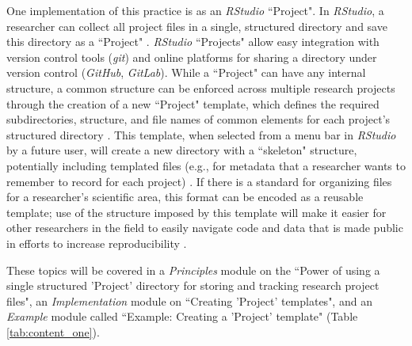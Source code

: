 \documentclass[pdftex,english,11.5pt,parskip=half]{scrartcl}
\begin{document}
One implementation of this practice is as an \textit{RStudio} ``Project". In \textit{RStudio}, a researcher can collect all project files in a single, structured directory and save this directory as a ``Project" \cite{rstudiousingprojects}. \textit{RStudio} ``Projects" allow easy integration with version control tools (\textit{git}) and online platforms for sharing a directory under version control (\textit{GitHub}, \textit{GitLab}). 
While a ``Project" can have any internal
structure, a common structure can be enforced across multiple research projects
through the creation of a new ``Project" template, which defines the required
subdirectories, structure, and file names of common elements for each project's structured directory \cite{rstudioprojecttemplate}. This template, when selected from a menu bar  in \textit{RStudio} by a
future user, will create a new directory with a ``skeleton" structure,
potentially including templated files (e.g., for metadata that a researcher wants to remember to record for each project) \cite{rstudioprojecttemplate}. If there is a standard for organizing files for a researcher's scientific area, this format can be encoded as a reusable template; use of the structure imposed by this template will make it easier for other researchers in the field to easily navigate code and data that is made public in efforts to increase reproducibility \cite{marwick2018packaging}. 

These topics will be
covered in a \textit{Principles} module on the ``Power of using a single
structured 'Project' directory for storing and tracking research project files",
an \textit{Implementation} module on ``Creating 'Project' templates", and an
\textit{Example} module called ``Example: Creating a 'Project' template" (Table \ref*{tab:content_one}).
\end{document}
